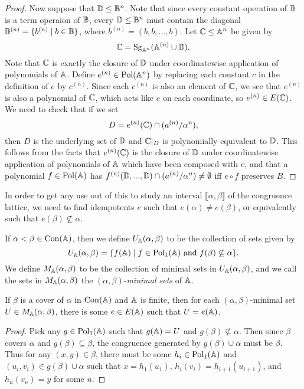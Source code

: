 \begin{appendices}
\begin{proof}
Now suppose that $\mathbb{D} \le \mathbb{B}^n$. Note that since every constant operation of $\mathbb{B}$ is a term operaion of $\mathbb{B}$, every $\mathbb{D} \le \mathbb{B}^n$ must contain the diagonal $\mathbb{B}^{(n)} = \{b^{(n)} \mid b \in \mathbb{B}\}$, where $b^{(n)} = (b, b, ..., b)$. Let $\mathbb{C} \le \mathbb{A}^n$ be given by
\[
\mathbb{C} = \operatorname{Sg}_{\mathbb{A}^n}(\mathbb{A}^{(n)} \cup \mathbb{D}).
\]
Note that $\mathbb{C}$ is exactly the closure of $\mathbb{D}$ under coordinatewise application of polynomials of $\mathbb{A}$. Define $e^{(n)} \in \operatorname{Pol}(\mathbb{A}^n)$ by replacing each constant $c$ in the definition of $e$ by $c^{(n)}$. Since each $c^{(n)}$ is also an element of $\mathbb{C}$, we see that $e^{(n)}$ is also a polynomial of $\mathbb{C}$, which acts like $e$ on each coordinate, so $e^{(n)} \in E(\mathbb{C})$. We need to check that if we set
\[
D = e^{(n)}(\mathbb{C}) \cap (a^{(n)}/\alpha^n),
\]
then $D$ is the underlying set of $\mathbb{D}$ and $\mathbb{C}|_D$ is polynomially equivalent to $\mathbb{D}$. This follows from the facts that $e^{(n)}(\mathbb{C})$ is the closure of $\mathbb{D}$ under coordinatewise application of polynomials of $\mathbb{A}$ which have been composed with $e$, and that a polynomial $f \in \operatorname{Pol}(\mathbb{A})$ has $f^{(n)}(\mathbb{D}, ..., \mathbb{D}) \cap (a^{(n)}/\alpha^n) \ne \emptyset$ iff $e \circ f$ preserves $B$.
\end{proof}

In order to get any use out of this to study an interval $\llbracket \alpha, \beta \rrbracket$ of the congruence lattice, we need to find idempotents $e$ such that $e(\alpha) \ne e(\beta)$, or equivalently such that $e(\beta) \not\subseteq \alpha$.

\begin{defn} If $\alpha < \beta \in \operatorname{Con}(\mathbb{A})$, then we define $U_{\mathbb{A}}(\alpha, \beta)$ to be the collection of sets given by
\[
U_{\mathbb{A}}(\alpha, \beta) = \{f(\mathbb{A}) \mid f \in \operatorname{Pol}_1(\mathbb{A}) \text{ and } f(\beta) \not\subseteq \alpha\}.
\]
We define $M_{\mathbb{A}}(\alpha, \beta)$ to be the collection of minimal sets in $U_{\mathbb{A}}(\alpha, \beta)$, and we call the sets in $M_{\mathbb{A}}(\alpha, \beta)$ the $(\alpha, \beta)$-\emph{minimal sets} of $\mathbb{A}$.
\end{defn}

\begin{prop}\label{prop-prime-tame} If $\beta$ is a cover of $\alpha$ in $\operatorname{Con}(\mathbb{A})$ and $\mathbb{A}$ is finite, then for each $(\alpha,\beta)$-minimal set $U \in M_{\mathbb{A}}(\alpha,\beta)$, there is some $e \in E(\mathbb{A})$ such that $U = e(\mathbb{A})$.
\end{prop}
\begin{proof} Pick any $g \in \operatorname{Pol}_1(\mathbb{A})$ such that $g(\mathbb{A}) = U$ and $g(\beta) \not\subseteq \alpha$. Then since $\beta$ covers $\alpha$ and $g(\beta) \subseteq \beta$, the congruence generated by $g(\beta) \cup \alpha$ must be $\beta$. Thus for any $(x,y) \in \beta$, there must be some $h_i \in \operatorname{Pol}_1(\mathbb{A})$ and $(u_i,v_i) \in g(\beta) \cup \alpha$ such that $x = h_1(u_1)$, $h_i(v_i) = h_{i+1}(u_{i+1})$, and $h_n(v_n) = y$ for some $n$.


\end{proof}
\end{appendices}
